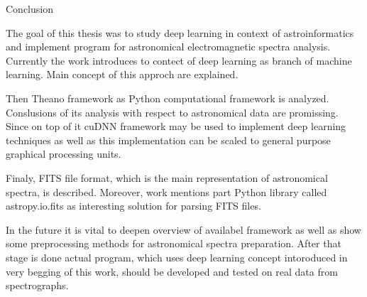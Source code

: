 \chap Conclusion

The goal of this thesis was to study deep learning in context of
astroinformatics and implement program for astronomical electromagnetic spectra
analysis. Currently the work introduces to contect of deep learning as branch
of machine learning. Main concept of this approch are explained.

Then Theano framework as Python computational framework is analyzed.
Conslusions of its analysis with respect to astronomical data are
promissing.
Since on top of it cuDNN framework may be used to implement deep learning
techniques as well as this implementation can be scaled to general purpose
graphical processing units.

Finaly, FITS file format, which is the main representation of astronomical
spectra, is described.
Moreover, work mentions part Python library called astropy.io.fits
as interesting solution for parsing FITS files.

In the future it is vital to deepen overview of availabel framework as well
as show some preprocessing methods for astronomical spectra preparation.
After that stage is done actual program, which uses deep learning concept
intoroduced in very begging of this work, should be developed and tested on
real data from spectrographs.
